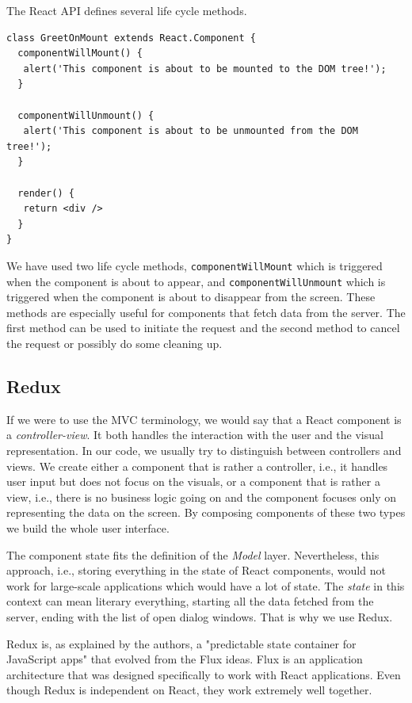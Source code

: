 The React API defines several life cycle methods.

\begin{verbatim}
class GreetOnMount extends React.Component {
  componentWillMount() {
   alert('This component is about to be mounted to the DOM tree!');
  }
  
  componentWillUnmount() {
   alert('This component is about to be unmounted from the DOM tree!');
  }
  
  render() {
   return <div />
  }
}
\end{verbatim}

We have used two life cycle methods, \texttt{componentWillMount} which is triggered when the component is about to appear, and \texttt{componentWillUnmount} which is triggered when the component is about to disappear from the screen. These methods are especially useful for components that fetch data from the server. The first method can be used to initiate the request and the second method to cancel the request or possibly do some cleaning up.

\subsection{Redux}
\label{sec:implementation:frontend-development-stack:redux}

If we were to use the MVC terminology, we would say that a React component is a \emph{controller-view}. It both handles the interaction with the user and the visual representation. In our code, we usually try to distinguish between controllers and views. We create either a component that is rather a controller, i.e., it handles user input but does not focus on the visuals, or a component that is rather a view, i.e., there is no business logic going on and the component focuses only on representing the data on the screen. By composing components of these two types we build the whole user interface.

The component state fits the definition of the \emph{Model} layer. Nevertheless, this approach, i.e., storing everything in the state of React components, would not work for large-scale applications which would have a lot of state. The \emph{state} in this context can mean literary everything, starting all the data fetched from the server, ending with the list of open dialog windows. That is why we use Redux.

Redux is,  as explained by the authors, a "predictable state container for JavaScript apps" that evolved from the Flux ideas. Flux is an application architecture that was designed specifically to work with React applications. Even though Redux is independent on React, they work extremely well together. 

